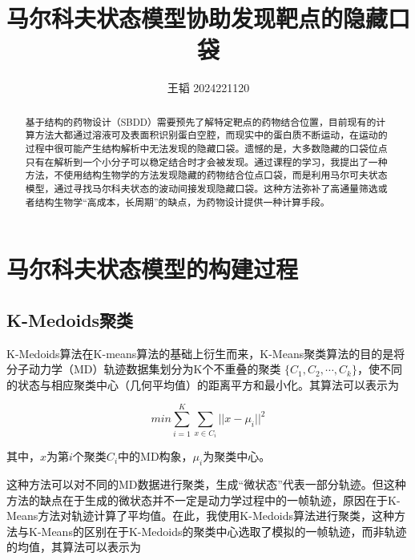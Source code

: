 \documentclass[a4paper]{article}
\title{马尔科夫状态模型协助发现靶点的隐藏口袋}                   %
\author{王韬 2024221120}
\begin{document}
	
\begin{CJK}{UTF8}{gbsn}
\maketitle

\begin{center}
\tableofcontents
\end{center}

 \begin{abstract}

基于结构的药物设计（SBDD）需要预先了解特定靶点的药物结合位置，目前现有的计算方法大都通过溶液可及表面积识别蛋白空腔，而现实中的蛋白质不断运动，在运动的过程中很可能产生结构解析中无法发现的隐藏口袋。遗憾的是，大多数隐藏的口袋位点只有在解析到一个小分子可以稳定结合时才会被发现。通过课程的学习，我提出了一种方法，不使用结构生物学的方法发现隐藏的药物结合位点口袋，而是利用马尔可夫状态模型，通过寻找马尔科夫状态的波动间接发现隐藏口袋。这种方法弥补了高通量筛选或者结构生物学“高成本，长周期”的缺点，为药物设计提供一种计算手段。

 \end{abstract}
\newpage


\section{马尔科夫状态模型的构建过程}
	\subsection{K-Medoids聚类}
\begin{sloppypar}
K-Medoids算法在K-means算法的基础上衍生而来，K-Means聚类算法的目的是将分子动力学（MD）轨迹数据集划分为K个不重叠的聚类
$\{C_{1},C_{2},  \cdots,  C_{k}\}$，使不同的状态与相应聚类中心（几何平均值）的距离平方和最小化。其算法可以表示为
\end{sloppypar}

\begin{equation}
min\sum_{i=1}^{K}\sum_{x\in C_{i}}^{} {\vert\vert x- \mu_{i} \vert\vert}^{2}
\end{equation}

其中，$x$为第$i$个聚类$C_{i}$中的MD构象，$\mu_{i}$为聚类中心。


这种方法可以对不同的MD数据进行聚类，生成“微状态”代表一部分轨迹。但这种方法的缺点在于生成的微状态并不一定是动力学过程中的一帧轨迹，原因在于K-Means方法对轨迹计算了平均值。在此，我使用K-Medoids算法进行聚类，这种方法与K-Means的区别在于K-Medoids的聚类中心选取了模拟的一帧轨迹，而非轨迹的均值，其算法可以表示为


\end{CJK}
\end{document}
